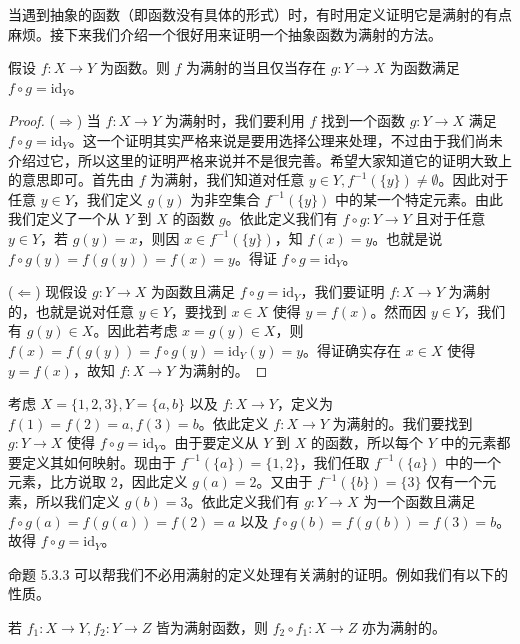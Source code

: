 当遇到抽象的函数（即函数没有具体的形式）时，有时用定义证明它是满射的有点麻烦。接下来我们介绍一个很好用来证明一个抽象函数为满射的方法。

\begin{proposition}
假设 $f : X \to Y$ 为函数。则 $f$ 为满射的当且仅当存在 $g : Y \to X$ 为函数满足 $f \circ g = \mathrm{id}_Y$。
\end{proposition}

\begin{proof}
($\Rightarrow$) 当 $f : X \to Y$ 为满射时，我们要利用 $f$ 找到一个函数 $g : Y \to X$ 满足 $f \circ g = \mathrm{id}_Y$。这一个证明其实严格来说是要用选择公理来处理，不过由于我们尚未介绍过它，所以这里的证明严格来说并不是很完善。希望大家知道它的证明大致上的意思即可。首先由 $f$ 为满射，我们知道对任意 $y \in Y, f^{-1}(\{y\}) \neq \emptyset$。因此对于任意 $y \in Y$，我们定义 $g(y)$ 为非空集合 $f^{-1}(\{y\})$ 中的某一个特定元素。由此我们定义了一个从 $Y$ 到 $X$ 的函数 $g$。依此定义我们有 $f \circ g : Y \to Y$ 且对于任意 $y \in Y$，若 $g(y) = x$，则因 $x \in f^{-1}(\{y\})$，知 $f(x) = y$。也就是说 $f \circ g(y) = f(g(y)) = f(x) = y$。得证 $f \circ g = \mathrm{id}_Y$。

($\Leftarrow$) 现假设 $g : Y \to X$ 为函数且满足 $f \circ g = \mathrm{id}_Y$，我们要证明 $f : X \to Y$ 为满射的，也就是说对任意 $y \in Y$，要找到 $x \in X$ 使得 $y = f(x)$。然而因 $y \in Y$，我们有 $g(y) \in X$。因此若考虑 $x = g(y) \in X$，则 $f(x) = f(g(y)) = f \circ g(y) = \mathrm{id}_Y(y) = y$。得证确实存在 $x \in X$ 使得 $y = f(x)$，故知 $f : X \to Y$ 为满射的。
\end{proof}

\begin{example}
考虑 $X = \{1, 2, 3\}, Y = \{a, b\}$ 以及 $f : X \to Y$，定义为 $f(1) = f(2) = a, f(3) = b$。依此定义 $f : X \to Y$ 为满射的。我们要找到 $g : Y \to X$ 使得 $f \circ g = \mathrm{id}_Y$。由于要定义从 $Y$ 到 $X$ 的函数，所以每个 $Y$ 中的元素都要定义其如何映射。现由于 $f^{-1}(\{a\}) = \{1, 2\}$，我们任取 $f^{-1}(\{a\})$ 中的一个元素，比方说取 2，因此定义 $g(a) = 2$。又由于 $f^{-1}(\{b\}) = \{3\}$ 仅有一个元素，所以我们定义 $g(b) = 3$。依此定义我们有 $g : Y \to X$ 为一个函数且满足 $f \circ g(a) = f(g(a)) = f(2) = a$ 以及 $f \circ g(b) = f(g(b)) = f(3) = b$。故得 $f \circ g = \mathrm{id}_Y$。
\end{example}

命题 5.3.3 可以帮我们不必用满射的定义处理有关满射的证明。例如我们有以下的性质。

\begin{proposition}
若 $f_1 : X \to Y, f_2 : Y \to Z$ 皆为满射函数，则 $f_2 \circ f_1 : X \to Z$ 亦为满射的。
\end{proposition}

